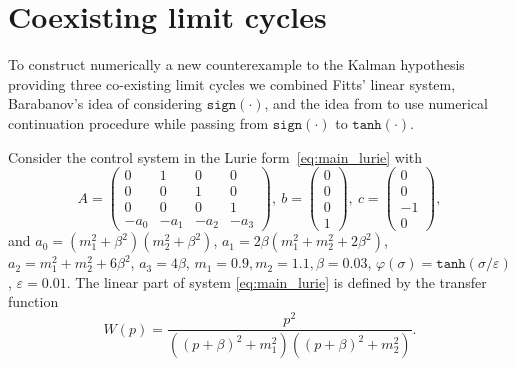 \documentclass{ifacconf}
\theoremstyle{plain}
\begin{document}
\section{Coexisting limit cycles}

To construct numerically a new counterexample to the Kalman hypothesis
providing three co-existing limit cycles
we combined Fitts' linear system,
Barabanov's idea of considering $\texttt{sign}(\cdot)$,
and the idea from \citep{LeonovK-2011-DAN} to use numerical continuation procedure
while passing from $\texttt{sign}(\cdot)$ to $\texttt{tanh}(\cdot)$.

Consider the control system in the Lurie form~\eqref{eq:main_lurie}
with
\begin{equation}\label{eq:main:matricies}
  A\!=\!\left(
  \begin{array}{cccc}
    0 & 1 & 0 & 0 \\
    0 & 0 & 1 & 0 \\
    0 & 0 & 0 & 1  \\
    -a_0 & -a_1 & -a_2 & -a_3
  \end{array}
  \right)\!\!, \
  b = \left(
    \begin{array}{c}
    0 \\ 0 \\ 0 \\ 1
    \end{array}
  \right)\!\!, \
  c = \left(
    \begin{array}{c}
    0 \\ 0 \\ -1 \\ 0
    \end{array}
  \right)\!\!,
\end{equation}
and $a_0 = (m_1^2+\beta^2)(m_2^2+\beta^2)$,
$a_1 = 2 \beta (m_1^2 + m_2^2 + 2 \beta^2)$,
$a_2 = m_1^2 + m_2^2 + 6 \beta^2$, $a_3 = 4 \beta$, $m_1 = 0.9, m_2 = 1.1,
\beta = 0.03$, $\varphi(\sigma) = \texttt{tanh}(\sigma / \varepsilon)$,
$\varepsilon = 0.01$.
The linear part of system \eqref{eq:main_lurie} is defined by the transfer function
\begin{equation}\label{eq:trFuncFitts}
  W(p) = \frac{p^2}{\left((p+\beta)^2 + m_1^2\right)\left((p+\beta)^2 + m_2^2\right)}.
\end{equation}
\end{document}
